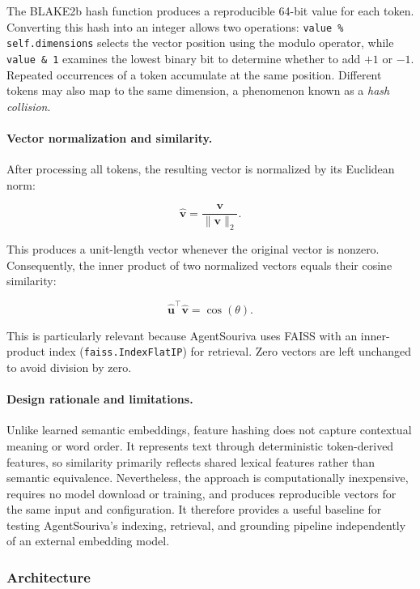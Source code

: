 \noindent
The BLAKE2b hash function produces a reproducible 64-bit
value for each token. Converting this hash into an integer
allows two operations: \texttt{value \% self.dimensions}
selects the vector position using the modulo operator,
while \texttt{value \& 1} examines the lowest binary bit
to determine whether to add $+1$ or $-1$. Repeated
occurrences of a token accumulate at the same position.
Different tokens may also map to the same dimension,
a phenomenon known as a \emph{hash collision}.

\paragraph{Vector normalization and similarity.}
After processing all tokens, the resulting vector is
normalized by its Euclidean norm:

\[
    \hat{\mathbf{v}} =
    \frac{\mathbf{v}}{\|\mathbf{v}\|_2}.
\]

This produces a unit-length vector whenever the original
vector is nonzero. Consequently, the inner product of
two normalized vectors equals their cosine similarity:

\[
    \hat{\mathbf{u}}^\top\hat{\mathbf{v}}
    = \cos(\theta).
\]

This is particularly relevant because AgentSouriva uses
FAISS with an inner-product index
(\texttt{faiss.IndexFlatIP}) for retrieval. Zero vectors
are left unchanged to avoid division by zero.

\paragraph{Design rationale and limitations.}
Unlike learned semantic embeddings, feature hashing does
not capture contextual meaning or word order. It represents
text through deterministic token-derived features, so
similarity primarily reflects shared lexical features
rather than semantic equivalence. Nevertheless, the
approach is computationally inexpensive, requires no
model download or training, and produces reproducible
vectors for the same input and configuration. It therefore
provides a useful baseline for testing AgentSouriva's
indexing, retrieval, and grounding pipeline independently
of an external embedding model.

\subsubsection{Architecture}

